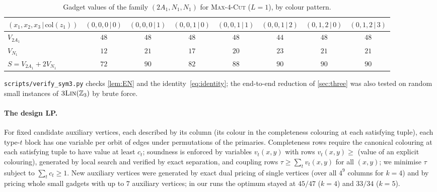 \documentclass[11pt,letterpaper]{article}
\theoremstyle{remark}
\newcommand{\MC}[1]{\textup{\textsc{Max-$#1$-Cut}}}
\newcommand{\lin}{\textup{\textsc{3Lin}}(\mathbb{Z}_3)}
\newcommand{\col}{\mathrm{col}}
\begin{document}
\begin{table}[h]
\centering\small
\begin{tabular}{@{}lccccccc@{}}
\toprule
$(x_1,x_2,x_3\,|\,\col(z_1))$ & $(0,0,0\,|\,0)$ & $(0,0,0\,|\,1)$ & $(0,0,1\,|\,0)$ & $(0,0,1\,|\,1)$
 & $(0,0,1\,|\,2)$ & $(0,1,2\,|\,0)$ & $(0,1,2\,|\,3)$\\
\midrule
$V_{2A_1}$ & $48$ & $48$ & $48$ & $48$ & $44$ & $48$ & $48$\\
$V_{N_1}$ & $12$ & $21$ & $17$ & $20$ & $23$ & $21$ & $21$\\
$S=V_{2A_1}+2V_{N_1}$ & $72$ & $90$ & $82$ & $88$ & $90$ & $90$ & $90$\\
\bottomrule
\end{tabular}
\caption{Gadget values of the family $(2A_1,N_1,N_1)$ for \MC{4} ($L=1$), by colour pattern.}
\label{tab:L1}
\end{table}
 \noindent\texttt{scripts/verify\_sym3.py} checks \cref{lem:EN} and the identity~\eqref{eq:identity};
the end-to-end reduction of \cref{sec:three} was also tested on random small instances of $\lin$ by brute
force.

\paragraph{The design LP.} For fixed candidate auxiliary vertices, each described by its column (its colour
in the completeness colouring at each satisfying tuple), each type-$t$ block has one variable per orbit of
edges under permutations of the primaries. Completeness rows require the canonical colouring at each
satisfying tuple to have value at least $c_t$; soundness is enforced by variables $v_t(x,y)$ with rows
$v_t(x,y)\ge$ (value of an explicit colouring), generated by local search and verified by exact
separation, and coupling rows $\tau\ge\sum_tv_t(x,y)$ for all $(x,y)$; we minimise $\tau$ subject to
$\sum_tc_t\ge1$. New auxiliary vertices were generated by exact dual pricing of single vertices (over all
$4^9$ columns for $k=4$) and by pricing whole small gadgets with up to $7$ auxiliary vertices; in our runs
the optimum stayed at $45/47$ ($k=4$) and $33/34$ ($k=5$).
\end{document}

